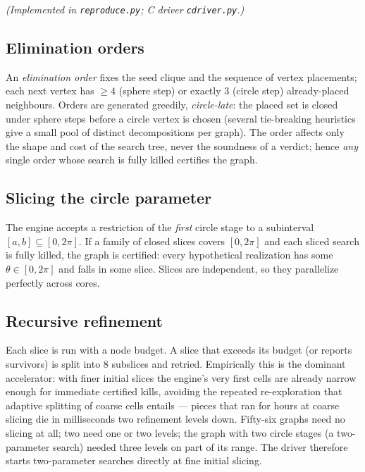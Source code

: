 \documentclass[11pt]{article}
\begin{document}
\emph{(Implemented in \texttt{reproduce.py}; C driver \texttt{cdriver.py}.)}

\subsection{Elimination orders}
An \emph{elimination order} fixes the seed clique and the sequence of vertex
placements; each next vertex has $\ge4$ (sphere step) or exactly $3$ (circle
step) already-placed neighbours. Orders are generated greedily,
\emph{circle-late}: the placed set is closed under sphere steps before a
circle vertex is chosen (several tie-breaking heuristics give a small pool of
distinct decompositions per graph). The order affects only the shape and cost
of the search tree, never the soundness of a verdict; hence \emph{any} single
order whose search is fully killed certifies the graph.

\subsection{Slicing the circle parameter}
The engine accepts a restriction of the \emph{first} circle stage to a
subinterval $[a,b]\subseteq[0,2\pi]$. If a family of closed slices covers
$[0,2\pi]$ and each sliced search is fully killed, the graph is certified:
every hypothetical realization has some $\theta\in[0,2\pi]$ and falls in some
slice. Slices are independent, so they parallelize perfectly across cores.

\subsection{Recursive refinement}
Each slice is run with a node budget. A slice that exceeds its budget (or
reports survivors) is split into $8$ subslices and retried. Empirically this
is the dominant accelerator: with finer initial slices the engine's very first
cells are already narrow enough for immediate certified kills, avoiding the
repeated re-exploration that adaptive splitting of coarse cells entails ---
pieces that ran for hours at coarse slicing die in milliseconds two refinement
levels down. Fifty-six graphs need no slicing at all; two need one or two
levels; the graph with two circle stages (a two-parameter search) needed three
levels on part of its range. The driver therefore starts two-parameter
searches directly at fine initial slicing.
\end{document}

